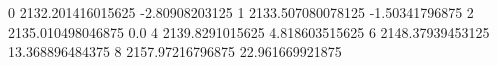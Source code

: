 0 2132.201416015625 -2.80908203125
1 2133.507080078125 -1.50341796875
2 2135.010498046875 0.0
4 2139.8291015625 4.818603515625
6 2148.37939453125 13.368896484375
8 2157.97216796875 22.961669921875
